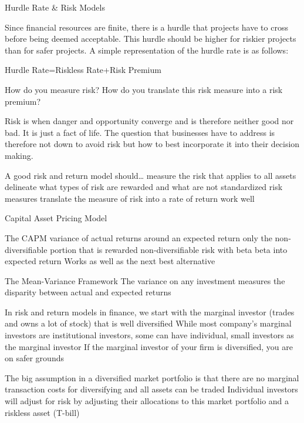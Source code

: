 \documentclass[10pt]{article}
\begin{document}
    \begin{core}{Hurdle Rate \& Risk Models}

      Since financial resources are finite, there is a hurdle that projects have to cross before being deemed acceptable. This hurdle should be higher for riskier projects than for safer projects.
      A simple representation of the hurdle rate is as follows:

      Hurdle Rate=Riskless Rate+Risk Premium

      How do you measure risk?
      How do you translate this risk measure into a risk premium?

      Risk is when danger and opportunity converge and is therefore neither good nor bad. It is just a fact of life. The question that businesses have to address is therefore not down to avoid risk but how to best incorporate it into their decision making.

      A good risk and return model should…
      measure the risk that applies to all assets
      delineate what types of risk are rewarded and what are not
      standardized risk measures
      translate the measure of risk into a rate of return
      work well 

    \end{core}

    \begin{core}{Capital Asset Pricing Model}

      The CAPM
      variance of actual returns around an expected return
      only the non-diversifiable portion that is rewarded
      non-diversifiable risk with beta
      beta into expected return
      Works as well as the next best alternative

      The Mean-Variance Framework
      The variance on any investment measures the disparity between actual and expected returns

      In risk and return models in finance, we start with the marginal investor (trades and owns a lot of stock) that is well diversified
      While most company’s marginal investors are institutional investors, some can have individual, small investors as the marginal investor
      If the marginal investor of your firm is diversified, you are on safer grounds

      The big assumption in a diversified market portfolio is that there are no marginal transaction costs for diversifying and all assets can be traded
      Individual investors will adjust for risk by adjusting their allocations to this market portfolio and a riskless asset (T-bill)

    \end{core}
\end{document}
